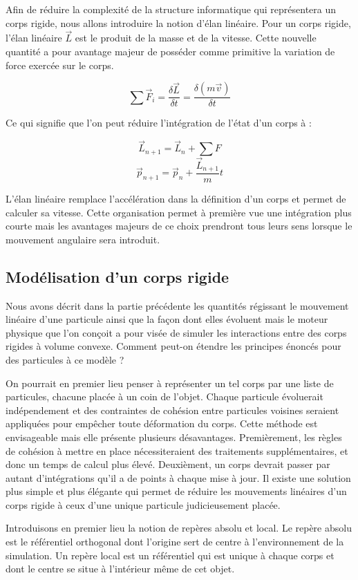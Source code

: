 Afin de réduire la complexité de la structure informatique qui représentera un corps rigide, nous allons introduire la notion d'élan linéaire. Pour un corps rigide, l'élan linéaire $\vec{L}$ est le produit de la masse et de la vitesse. Cette nouvelle quantité a pour avantage majeur de posséder comme primitive la variation de force exercée sur le corps.

\[{\sum \vec{F}_i} = \frac{\delta \vec{L}}{\delta t} = \frac{\delta (m\vec{v})}{\delta t}\]

Ce qui signifie que l'on peut réduire l'intégration de l'état d'un corps à :

\[\vec{L}_{n+1} = \vec{L}_n + {\sum F}\]
\[\vec{p}_{n+1} = \vec{p}_n + \frac{\vec{L}_{n+1}}{m} t\]

L'élan linéaire remplace l'accélération dans la définition d'un corps et permet de calculer sa vitesse. Cette organisation permet à première vue une intégration plus courte mais les avantages majeurs de ce choix prendront tous leurs sens lorsque le mouvement angulaire sera introduit.

\subsection{Modélisation d'un corps rigide}

Nous avons décrit dans la partie précédente les quantités régissant le mouvement linéaire d'une particule ainsi que la façon dont elles évoluent mais le moteur physique que l'on conçoit a pour visée de simuler les interactions entre des corps rigides à volume convexe. Comment peut-on étendre les principes énoncés pour des particules à ce modèle ?

On pourrait en premier lieu penser à représenter un tel corps par une liste de particules, chacune placée à un coin de l'objet. Chaque particule évoluerait indépendement et des contraintes de cohésion entre particules voisines seraient appliquées pour empêcher toute déformation du corps. Cette méthode est envisageable mais elle présente plusieurs désavantages. Premièrement, les règles de cohésion à mettre en place nécessiteraient des traitements supplémentaires, et donc un temps de calcul plus élevé. Deuxièment, un corps devrait passer par autant d'intégrations qu'il a de points à chaque mise à jour. Il existe une solution plus simple et plus élégante qui permet de réduire les mouvements linéaires d'un corps rigide à ceux d'une unique particule judicieusement placée.

Introduisons en premier lieu la notion de repères absolu et local. Le repère absolu est le référentiel orthogonal dont l'origine sert de centre à l'environnement de la simulation. Un repère local est un référentiel qui est unique à chaque corps et dont le centre se situe à l'intérieur même de cet objet.

